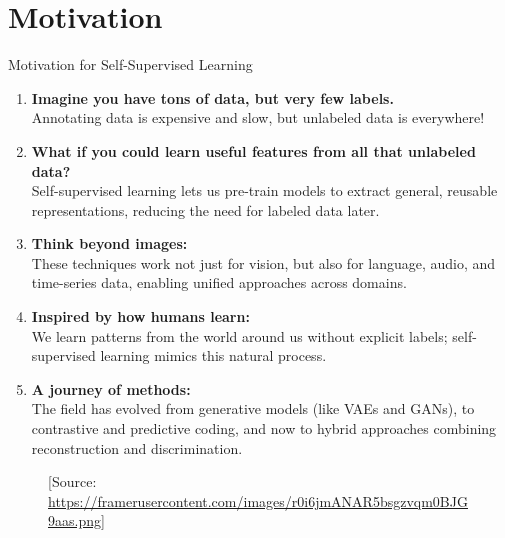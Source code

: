 \section{Motivation}

\begin{frame}{Motivation for Self-Supervised Learning}
    \begin{enumerate}
        \setlength{\itemsep}{-0.5em}
        \item \textbf{Imagine you have tons of data, but very few labels.}\\
        Annotating data is expensive and slow, but unlabeled data is everywhere!\\[0.5em]
        \item<2-> \textbf{What if you could learn useful features from all that unlabeled data?}\\
        Self-supervised learning lets us pre-train models to extract general, reusable representations, reducing the need for labeled data later.\\[0.5em]
        \item<3-> \textbf{Think beyond images:}\\
        These techniques work not just for vision, but also for language, audio, and time-series data, enabling unified approaches across domains.\\[0.5em]
        \item<4-> \textbf{Inspired by how humans learn:}\\
        We learn patterns from the world around us without explicit labels; self-supervised learning mimics this natural process.\\[0.5em]
        \item<5-> \textbf{A journey of methods:}\\
        The field has evolved from generative models (like VAEs and GANs), to contrastive and predictive coding, and now to hybrid approaches combining reconstruction and discrimination.
    \end{enumerate}
\end{frame}

\begin{frame}[allowframebreaks]{}
    \begin{figure}
        \centering
        \caption*{\scriptsize [Source: \url{https://framerusercontent.com/images/r0i6jmANAR5bsgzvqm0BJG9aas.png}]}
    \end{figure}
\end{frame}